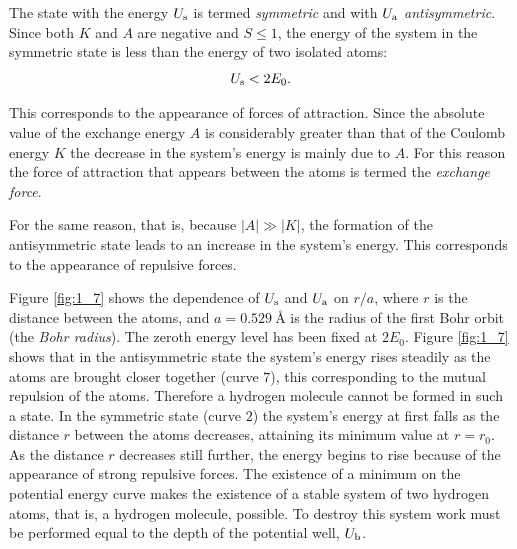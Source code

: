 The state with the energy $U_{\text{s}}$ is termed \textit{symmetric} and with $U_{\text{a}}$ \textit{antisymmetric}. Since both $K$ and $A$ are negative and $S\leqslant 1$, the energy of the system in the symmetric state is less than the energy of two isolated atoms:
\begin{equation}\label{eq:1_13}
	U_{\text{s}} < 2 E_0.
\end{equation}

\noindent
This corresponds to the appearance of forces of attraction. Since the absolute value of the exchange energy $A$ is considerably greater than that of the Coulomb energy $K$ the decrease in the system's energy is mainly due to $A$. For this reason the force of attraction that appears between the atoms is termed the \textit{exchange force}.

For the same reason, that is, because $|A|\gg |K|$, the formation of the antisymmetric state leads to an increase in the system's energy. This corresponds to the appearance of repulsive forces.

Figure \ref{fig:1_7} shows the dependence of $U_{\text{s}}$ and $U_{\text{a}}$ on $r/a$, where $r$ is the distance between the atoms, and $a=\SI{0.529}{\angstrom}$ is the radius of the first Bohr orbit (the \textit{Bohr radius}). The zeroth energy level has been fixed at $2E_0$. Figure \ref{fig:1_7} shows that in the antisymmetric state the system's energy rises steadily as the atoms are brought closer together (curve $7$), this corresponding to the mutual repulsion of the atoms. Therefore a hydrogen molecule cannot be formed in such a state. In the symmetric state (curve $2$) the system's energy at first falls as the distance $r$ between the atoms decreases, attaining its minimum value at $r=r_0$.
As the distance $r$ decreases still further, the energy begins to rise because of the appearance of strong repulsive forces. The existence of a minimum on the potential energy curve makes the existence of a stable system of two hydrogen atoms, that is, a hydrogen molecule, possible. To destroy this system work must be performed equal to the depth of the potential well, $U_{\text{b}}$.

